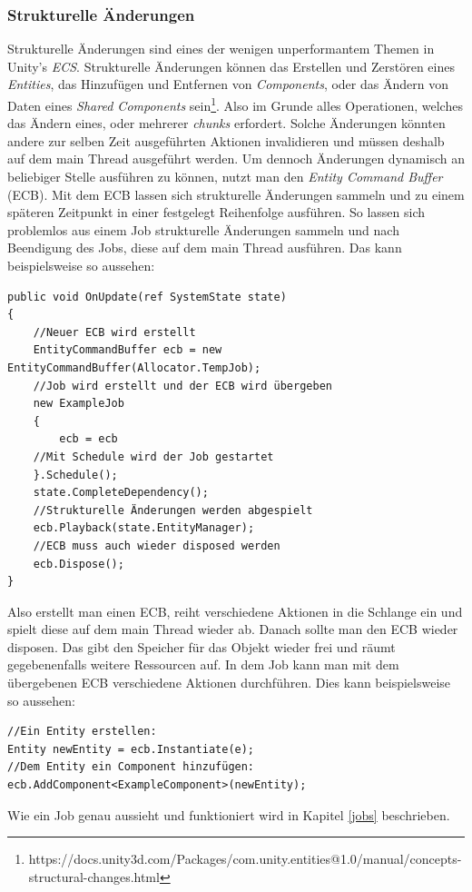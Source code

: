 \documentclass[12pt, titlepage]{article}
\DeclareRobustCommand{\#}{\adjustbox{valign=B,totalheight=.57\baselineskip}{\oldhash}}%
\begin{document}
\subsubsection{Strukturelle Änderungen}\label{structuralChanges}
Strukturelle Änderungen sind eines der wenigen unperformantem Themen in Unity's \textit{ECS}. Strukturelle Änderungen können das Erstellen und Zerstören eines \textit{Entities}, das Hinzufügen und Entfernen von \textit{Components}, oder das Ändern von Daten eines \textit{Shared Components} sein\footnote{https://docs.unity3d.com/Packages/com.unity.entities@1.0/manual/concepts-structural-changes.html}. Also im Grunde alles Operationen, welches das Ändern eines, oder mehrerer \textit{chunks} erfordert. Solche Änderungen könnten andere zur selben Zeit ausgeführten Aktionen invalidieren und müssen deshalb auf dem main Thread ausgeführt werden. Um dennoch Änderungen dynamisch an beliebiger Stelle ausführen zu können, nutzt man den \textit{Entity Command Buffer} (ECB). Mit dem ECB lassen sich strukturelle Änderungen sammeln und zu einem späteren Zeitpunkt in einer festgelegt Reihenfolge ausführen. So lassen sich problemlos aus einem Job strukturelle Änderungen sammeln und nach Beendigung des Jobs, diese auf dem main Thread ausführen. Das kann beispielsweise so aussehen:
\begin{lstlisting}[style=code, caption={ECB Beispiel}]
public void OnUpdate(ref SystemState state)
{
    //Neuer ECB wird erstellt
    EntityCommandBuffer ecb = new EntityCommandBuffer(Allocator.TempJob);
    //Job wird erstellt und der ECB wird übergeben
    new ExampleJob
    {
        ecb = ecb
    //Mit Schedule wird der Job gestartet
    }.Schedule();
    state.CompleteDependency();
    //Strukturelle Änderungen werden abgespielt
    ecb.Playback(state.EntityManager);
    //ECB muss auch wieder disposed werden
    ecb.Dispose();
}
\end{lstlisting}
Also erstellt man einen ECB, reiht verschiedene Aktionen in die Schlange ein und spielt diese auf dem main Thread wieder ab. Danach sollte man den ECB wieder disposen. Das gibt den Speicher für das Objekt wieder frei und räumt gegebenenfalls weitere Ressourcen auf. In dem Job kann man mit dem übergebenen ECB verschiedene Aktionen durchführen. Dies kann beispielsweise so aussehen:
\begin{lstlisting}[style=code, caption={ECB Aktionen Beispiel}]
//Ein Entity erstellen:
Entity newEntity = ecb.Instantiate(e);
//Dem Entity ein Component hinzufügen:
ecb.AddComponent<ExampleComponent>(newEntity);
\end{lstlisting}
Wie ein Job genau aussieht und funktioniert wird in Kapitel \ref{jobs} beschrieben.
\end{document}
